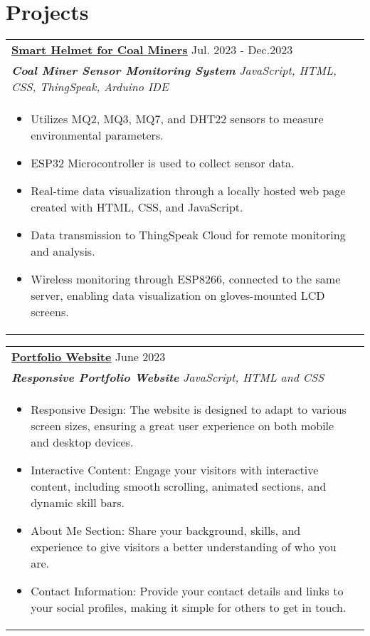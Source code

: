 \documentclass[a4paper,8pt]{article}
\begin{document}
\section{Projects}
\begin{tabularx}{\linewidth}{ @{}l r@{} }
\color[HTML]{1C033C} \textbf{\uline{\href{https://github.com/akc2531/COALMINERS}{Smart Helmet for Coal Miners}}} \hfill \color[HTML]{371e77} Jul. 2023 - Dec.2023 \\[4pt]
\color[HTML]{371e77}\textbf{\textit{Coal Miner Sensor Monitoring System }} \hfill \color[HTML]{4B28A4} \textit{ JavaScript, HTML, CSS, ThingSpeak, Arduino IDE} \\[5pt]
\begin{minipage}[t]{\linewidth}
    \begin{itemize}[nosep,after=\strut, leftmargin=2em, itemsep=2pt]
        \item Utilizes MQ2, MQ3, MQ7, and DHT22 sensors to measure environmental parameters.
        \item ESP32 Microcontroller is used to collect sensor data.
        \item Real-time data visualization through a locally hosted web page created with HTML, CSS, and JavaScript.
        \item Data transmission to ThingSpeak Cloud for remote monitoring and analysis.
        \item Wireless monitoring through ESP8266, connected to the same server, enabling data visualization on gloves-mounted LCD screens.
    \end{itemize}
    \end{minipage}
\end{tabularx}

\begin{tabularx}{\linewidth}{ @{}l r@{} }
\color[HTML]{1C033C} \textbf{\uline{\href{https://akc2531.github.io/MyPortfolio/}{Portfolio Website}}} \hfill \color[HTML]{371e77} June 2023 \\[4pt]
\color[HTML]{371e77}\textbf{\textit{Responsive Portfolio Website}} \hfill \color[HTML]{4B28A4} \textit{ JavaScript, HTML and CSS} \\[5pt]
\begin{minipage}[t]{\linewidth}
    \begin{itemize}[nosep,after=\strut, leftmargin=2em, itemsep=2pt]
        \item Responsive Design: The website is designed to adapt to various screen sizes, ensuring a great user experience on both mobile and desktop devices.
        \item Interactive Content: Engage your visitors with interactive content, including smooth scrolling, animated sections, and dynamic skill bars.
        \item About Me Section: Share your background, skills, and experience to give visitors a better understanding of who you are.
        \item Contact Information: Provide your contact details and links to your social profiles, making it simple for others to get in touch.
    \end{itemize}
    \end{minipage}
\end{tabularx}
\end{document}
